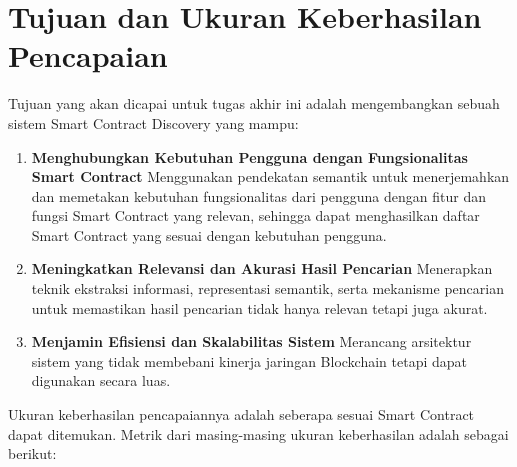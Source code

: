\section{Tujuan dan Ukuran Keberhasilan Pencapaian}
\label{sec:tujuan-ukuran-keberhasilan-pencapaian}


Tujuan yang akan dicapai untuk tugas akhir ini adalah mengembangkan sebuah sistem Smart Contract Discovery yang mampu: 

\begin{enumerate}
  \item \textbf{Menghubungkan Kebutuhan Pengguna dengan Fungsionalitas Smart Contract} \newline
  Menggunakan pendekatan semantik untuk menerjemahkan dan memetakan kebutuhan fungsionalitas dari pengguna dengan fitur dan fungsi Smart Contract yang relevan, sehingga dapat menghasilkan daftar Smart Contract yang sesuai dengan kebutuhan pengguna.
  \item \textbf{Meningkatkan Relevansi dan Akurasi Hasil Pencarian} \newline
  Menerapkan teknik ekstraksi informasi, representasi semantik, serta mekanisme pencarian untuk memastikan hasil pencarian tidak hanya relevan tetapi juga akurat.
  \item \textbf{Menjamin Efisiensi dan Skalabilitas Sistem} \newline
  Merancang arsitektur sistem yang tidak membebani kinerja jaringan Blockchain tetapi dapat digunakan secara luas.
\end{enumerate}


Ukuran keberhasilan pencapaiannya adalah seberapa sesuai Smart Contract dapat ditemukan. Metrik dari masing-masing ukuran keberhasilan adalah sebagai berikut:

